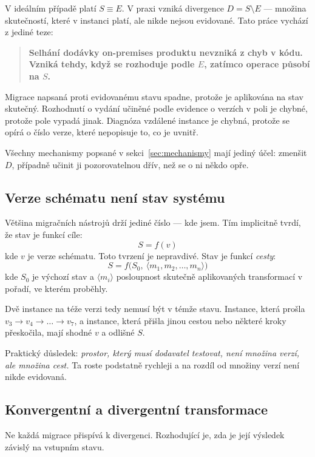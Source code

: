 \documentclass[11pt,a4paper]{article}
\begin{document}
V ideálním případě platí $S \equiv E$. V praxi vzniká divergence
$D = S \setminus E$ --- množina skutečností, které v instanci platí,
ale nikde nejsou evidované. Tato práce vychází z jediné teze:

\begin{quote}
\textbf{Selhání dodávky on-premises produktu nevzniká z chyb v kódu.
Vzniká tehdy, když se rozhoduje podle $E$, zatímco operace působí na $S$.}
\end{quote}

Migrace napsaná proti evidovanému stavu spadne, protože je aplikována na
stav skutečný. Rozhodnutí o vydání učiněné podle evidence o verzích v poli
je chybné, protože pole vypadá jinak. Diagnóza vzdálené instance je chybná,
protože se opírá o číslo verze, které nepopisuje to, co je uvnitř.

Všechny mechanismy popsané v sekci~\ref{sec:mechanismy} mají jediný účel:
zmenšit $D$, případně učinit ji pozorovatelnou dřív, než se o ni někdo
opře.

\subsection{Verze schématu není stav systému}
\label{sub:pathdep}

Většina migračních nástrojů drží jediné číslo --- kde jsem. Tím implicitně
tvrdí, že stav je funkcí cíle:
\[
S = f(v)
\]
kde $v$ je verze schématu. Toto tvrzení je nepravdivé. Stav je funkcí
\emph{cesty}:
\[
S = f\bigl(S_0,\ \langle m_1, m_2, \dots, m_n \rangle\bigr)
\]
kde $S_0$ je výchozí stav a $\langle m_i \rangle$ posloupnost skutečně
aplikovaných transformací v pořadí, ve kterém proběhly.

Dvě instance na téže verzi tedy nemusí být v témže stavu. Instance, která
prošla $v_3 \to v_4 \to \dots \to v_7$, a instance, která přišla jinou
cestou nebo některé kroky přeskočila, mají shodné $v$ a odlišné $S$.

Praktický důsledek: \emph{prostor, který musí dodavatel testovat, není
množina verzí, ale množina cest.} Ta roste podstatně rychleji a na rozdíl
od množiny verzí není nikde evidovaná.

\subsection{Konvergentní a divergentní transformace}

Ne každá migrace přispívá k divergenci. Rozhodující je, zda je její
výsledek závislý na vstupním stavu.
\end{document}

